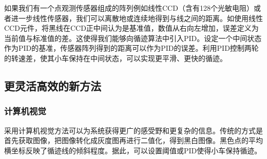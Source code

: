 \documentclass{report}
\begin{document}
如果我们有一个点观测传感器组成的阵列例如线性CCD（含有128个光敏电阻）或者进一步线性传感器，我们可以离散地或连续地得到与线之间的距离。如使用线性CCD元件\cite{CCD}，将黑线在CCD正中间认为是基准值，数值从右向左增加，误差定义为当前值与标准值的差。这使得我们能够向循迹算法中引入PID。设定一个中间状态作为PID的基准，传感器阵列得到的距离可以作为PID的误差。利用PID控制两轮的转速差，使其小车保持在中间状态，可以实现更平滑、更快的循迹。

\subsection{更灵活高效的新方法}
\label{subsec:label}
\subsubsection{计算机视觉\cite{opencv}}
\label{subsec:label}
采用计算机视觉方法可以为系统获得更广的感受野和更复杂的信息。传统的方式是首先获取图像，把图像转化成灰度图再进行二值化，得到黑白图像。黑色点的平均横坐标反映了循迹线的倾斜程度。据此，可以设置阈值或PID使得小车保持循迹。
\end{document}
